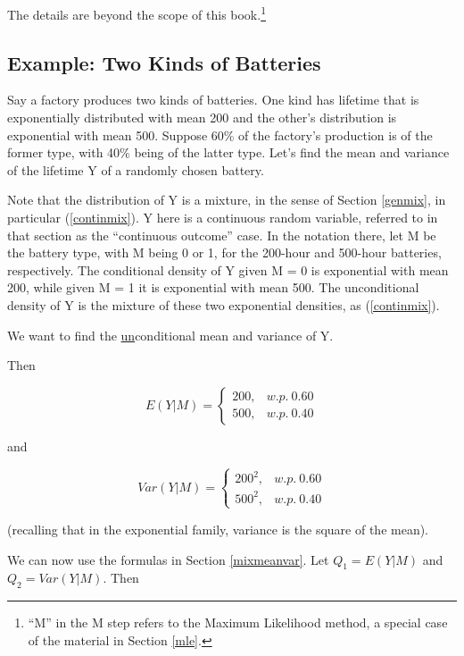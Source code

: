 \documentclass[11pt]{article}
\begin{document}
The details are beyond the scope of this book.\footnote{``M'' in the M
step refers to the Maximum Likelihood method, a special case of the
material in Section \ref{mle}.}

\subsection{Example:  Two Kinds of Batteries}

Say a factory produces two kinds of batteries.  One kind has lifetime
that is exponentially distributed with mean 200 and the other's
distribution is exponential with mean 500.  Suppose 60\% of the
factory's production is of the former type, with 40\% being of the
latter type.  Let's find the mean and variance of the lifetime Y of a
randomly chosen battery.

Note that the distribution of Y is a mixture, in the sense of Section
\ref{genmix}, in particular (\ref{continmix}).  Y here is a continuous
random variable, referred to in that section as the ``continuous
outcome'' case.   In the notation there, let M be the battery type, with
M being 0 or 1, for the 200-hour and 500-hour batteries, respectively.
The conditional density of Y given M = 0 is exponential with mean 200,
while given M = 1 it is exponential with mean 500.  The unconditional
density of Y is the mixture of these two exponential densities, as 
(\ref{continmix}).

We want to find the \underline{un}conditional mean and variance of Y.

Then

\begin{equation}
\label{batt1}
E(Y|M)=\left\{ \begin{array}{rl}
200, & w.p. ~ 0.60 \\
500, & w.p. ~ 0.40
\end{array}\right. 
\end{equation}

and 

\begin{equation}
\label{batt2}
Var(Y|M)=\left\{ \begin{array}{rl}
200^2, & w.p. ~ 0.60 \\
500^2, & w.p. ~ 0.40
\end{array}\right. 
\end{equation}

(recalling that in the exponential family, variance is the square of the
mean).

We can now use the formulas in Section \ref{mixmeanvar}.  Let $Q_1 =
E(Y|M)$  and $Q_2 = Var(Y|M)$.  Then
\end{document}
